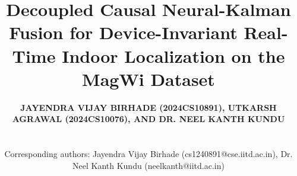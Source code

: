 \documentclass[journal,twoside,compsoc]{IEEEtran}
\begin{document}
\title{
    \color{accessblue}\Huge\bfseries\sffamily Decoupled Causal Neural-Kalman Fusion for Device-Invariant Real-Time Indoor Localization on the MagWi Dataset
}

\author{
    \uppercase{\textbf{Jayendra Vijay Birhade (2024CS10891), Utkarsh Agrawal (2024CS10076), and Dr. Neel Kanth Kundu}}\\
    \vspace{0.15cm}
    \\
    \\
    \small Corresponding authors: Jayendra Vijay Birhade (cs1240891@cse.iitd.ac.in), Dr. Neel Kanth Kundu (neelkanth@iitd.ac.in)
}
\end{document}
